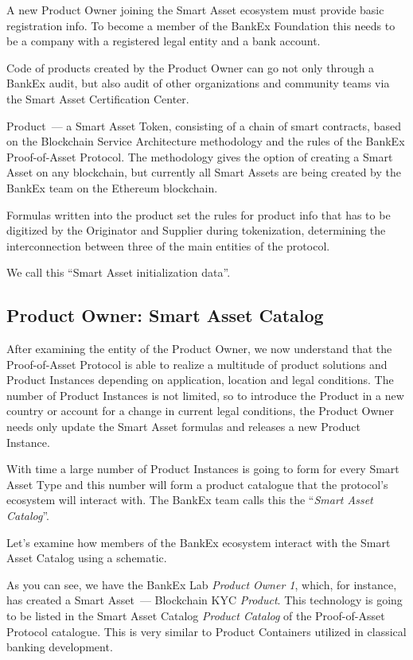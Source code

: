 \documentclass{article}
\begin{document}
\begin{multicols}{2}
A new Product Owner joining the Smart Asset ecosystem must provide basic registration info. To become a member of the BankEx Foundation this needs to be a company with a registered legal entity and a bank account.

Code of products created by the Product Owner can go not only through a BankEx audit, but also audit of other organizations and community teams via the Smart Asset Certification Center.

Product~--- a Smart Asset Token, consisting of a chain of smart contracts, based on the Blockchain Service Architecture methodology and the rules of the BankEx Proof-of-Asset Protocol. The methodology gives the option of creating a Smart Asset on any blockchain, but currently all Smart Assets are being created by the BankEx team on the Ethereum blockchain. 

Formulas written into the product set the rules for product info that has to be digitized by the Originator and Supplier during tokenization, determining the interconnection between three of the main entities of the protocol.

We call this \enquote{Smart Asset initialization data}.

\subsection{Product Owner: Smart Asset Catalog}

After examining the entity of the Product Owner, we now understand that the Proof-of-Asset Protocol is able to realize a multitude of product solutions and Product Instances depending on application, location and legal conditions. The number of Product Instances is not limited, so to introduce the Product in a new country or account for a change in current legal conditions, the Product Owner needs only update the Smart Asset formulas and releases a new Product Instance. 

With time a large number of Product Instances is going to form for every Smart Asset Type and this number will form a product catalogue that the protocol’s ecosystem will interact with. The BankEx team calls this the \enquote{\textit{Smart Asset Catalog}}.

Let’s examine how members of the BankEx ecosystem interact with the Smart Asset Catalog using a schematic. 

As you can see, we have the BankEx Lab \textit{Product Owner 1}, which, for instance, has created a Smart Asset~--- Blockchain KYC \textit{Product}. This technology is going to be listed in the Smart Asset Catalog \textit{Product Catalog} of the Proof-of-Asset Protocol catalogue. This is very similar to Product Containers utilized in classical banking development.


\end{multicols}
\end{document}
